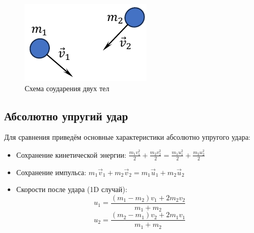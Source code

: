 \begin{figure}[H]
	\centering
	\includegraphics[width=0.5\linewidth]{image/Удар}
	\caption{Схема соударения двух тел}
	\label{fig:collision}
\end{figure}

\subsection{Абсолютно упругий удар}

Для сравнения приведём основные характеристики абсолютно упругого удара:

\begin{itemize}
	\item Сохранение кинетической энергии: $\frac{m_1 v_1^2}{2} + \frac{m_2 v_2^2}{2} = \frac{m_1 u_1^2}{2} + \frac{m_2 u_2^2}{2}$
	\item Сохранение импульса: $m_1\vec{v}_1 + m_2\vec{v}_2 = m_1\vec{u}_1 + m_2\vec{u}_2$
	\item Скорости после удара (1D случай):
	\[ u_1 = \frac{(m_1 - m_2)v_1 + 2m_2 v_2}{m_1 + m_2} \]
	\[ u_2 = \frac{(m_2 - m_1)v_2 + 2m_1 v_1}{m_1 + m_2} \]
\end{itemize}
